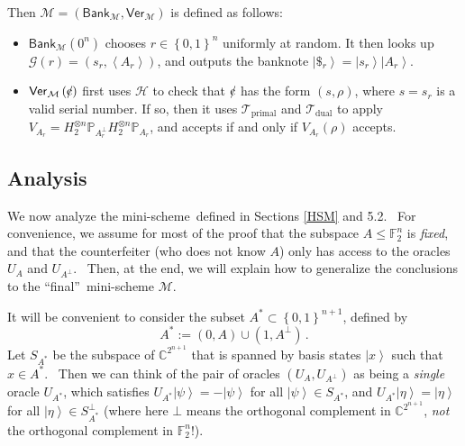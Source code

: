 Then $\mathcal{M}=\left(  \mathsf{Bank}_{\mathcal{M}},\mathsf{Ver}%
_{\mathcal{M}}\right)  $ is defined as follows:

\begin{itemize}
\item $\mathsf{Bank}_{\mathcal{M}}\left(  0^{n}\right)  $ chooses
$r\in\left\{  0,1\right\}  ^{n}$ uniformly at random. It then looks up
$\mathcal{G}\left(  r\right)  =\left(  s_{r},\left\langle A_{r}\right\rangle
\right)  $, and outputs the banknote $\left\vert \$_{r}\right\rangle
=\left\vert s_{r}\right\rangle \left\vert A_{r}\right\rangle $.

\item $\mathsf{Ver}_{\mathcal{M}}\left(
%
%
\hbox{\rm\rlap/c}%
%
\right)  $ first uses $\mathcal{H}$ to check that $%
%
%
\hbox{\rm\rlap/c}%
%
$ has the form $\left(  s,\rho\right)  $, where $s=s_{r}$ is a valid serial
number. If so, then it uses $\mathcal{T}_{\operatorname*{primal}}$ and
$\mathcal{T}_{\operatorname*{dual}}$ to apply $V_{A_{r}}=H_{2}^{\otimes
n}\mathbb{P}_{A_{r}^{\bot}}H_{2}^{\otimes n}\mathbb{P}_{A_{r}}$, and accepts
if and only if $V_{A_{r}}\left(  \rho\right)  $ accepts.
\end{itemize}

\subsection{Analysis\label{ANALYSIS}}

We now analyze the mini-scheme\ defined in Sections \ref{HSM} and 5.2.
\ For convenience, we assume for most of the proof that the subspace
$A\leq\mathbb{F}_{2}^{n}$ is \emph{fixed}, and that the counterfeiter (who
does not know $A$) only has access to the oracles $U_{A}$ and $U_{A^{\bot}}$.
\ Then, at the end, we will explain how to generalize the conclusions to the
\textquotedblleft final\textquotedblright\ mini-scheme $\mathcal{M}$.

It will be convenient to consider the subset $A^{\ast}\subset\left\{
0,1\right\}  ^{n+1}$, defined by%
\[
A^{\ast}:=\left(  0,A\right)  \cup(1,A^{\bot})\,.
\]
Let $S_{A^{\ast}}$ be the subspace of $\mathbb{C}^{2^{n+1}}$ that is spanned
by basis states $\left\vert x\right\rangle $ such that $x\in A^{\ast}$.
\ Then we can think of the pair of oracles $\left(  U_{A},U_{A^{\bot}}\right)
$ as being a \emph{single} oracle $U_{A^{\ast}}$, which satisfies
$U_{A^{\ast}}\left\vert \psi\right\rangle =-\left\vert \psi\right\rangle
$ for all $\left\vert \psi\right\rangle \in S_{A^{\ast}}$, and $U_{A^{\ast}%
}\left\vert \eta\right\rangle =\left\vert \eta\right\rangle $ for all
$\left\vert \eta\right\rangle \in S_{A^{\ast}}^{\bot}$ (where here $\bot
$ means the orthogonal complement in $\mathbb{C}^{2^{n+1}}$, \emph{not} the
orthogonal complement in $\mathbb{F}_{2}^{n}$!).

